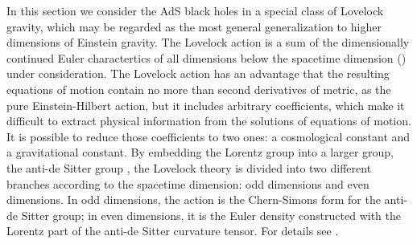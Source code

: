 \documentclass[a4paper,12pt]{article}
\begin{document}
In this section we consider the AdS black holes in a special class of
Lovelock gravity, which may be regarded as the most general generalization
to higher dimensions of Einstein gravity. The Lovelock action is a sum of
 the dimensionally continued Euler charactertics of all dimensions below the
spacetime dimension (\coordHE{}) under consideration. The Lovelock action has an 
advantage that the resulting equations of motion contain no more than 
second derivatives of metric, as the pure 
Einstein-Hilbert action, but it includes \myHighlight{$[D/2]$}\coordHE{} arbitrary coefficients, 
which make it difficult to extract physical information from the solutions of 
equations of motion. It is possible to reduce those coefficients to 
two ones: a cosmological constant and a gravitational constant. By embedding 
the Lorentz group \coordHE{} into a larger group, the anti-de Sitter 
group \coordHE{}, the Lovelock theory is divided into two different branches 
according to the spacetime dimension: odd dimensions and even 
dimensions. In odd dimensions, the action is the Chern-Simons form for the 
anti-de Sitter group; in even dimensions, it is the Euler density constructed
with the Lorentz part of the anti-de Sitter curvature tensor. For details 
see \cite{Bano}.
\end{document}
